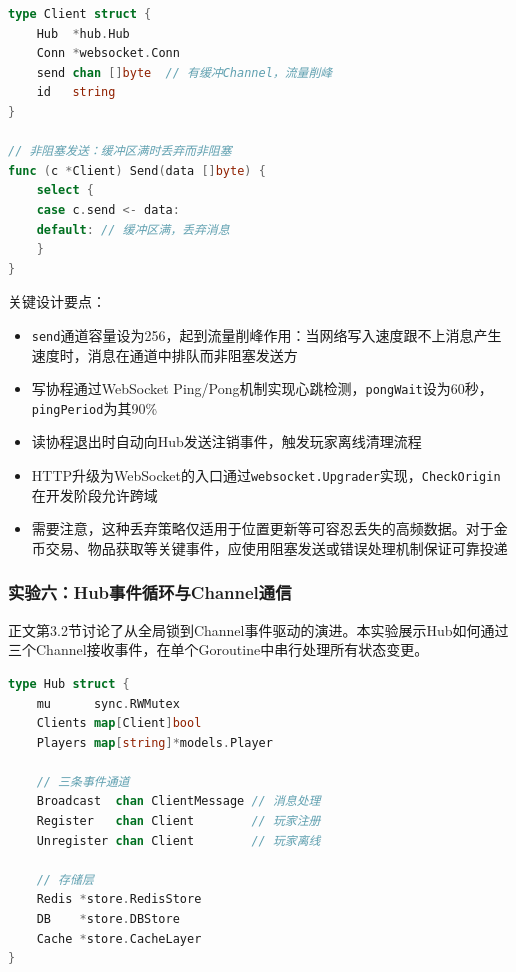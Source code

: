 \begin{tcolorbox}[title=WebSocket客户端核心结构]
\begin{lstlisting}[style=codeblock, language=go]
type Client struct {
    Hub  *hub.Hub
    Conn *websocket.Conn
    send chan []byte  // 有缓冲Channel，流量削峰
    id   string
}

// 非阻塞发送：缓冲区满时丢弃而非阻塞
func (c *Client) Send(data []byte) {
    select {
    case c.send <- data:
    default: // 缓冲区满，丢弃消息
    }
}
\end{lstlisting}
\end{tcolorbox}

关键设计要点：
\begin{itemize}
\item \texttt{send}通道容量设为256，起到流量削峰作用：当网络写入速度跟不上消息产生速度时，消息在通道中排队而非阻塞发送方
\item 写协程通过WebSocket Ping/Pong机制实现心跳检测，\texttt{pongWait}设为60秒，\texttt{pingPeriod}为其90\%
\item 读协程退出时自动向Hub发送注销事件，触发玩家离线清理流程
\item HTTP升级为WebSocket的入口通过\texttt{websocket.Upgrader}实现，\texttt{CheckOrigin}在开发阶段允许跨域
\item 需要注意，这种丢弃策略仅适用于位置更新等可容忍丢失的高频数据。对于金币交易、物品获取等关键事件，应使用阻塞发送或错误处理机制保证可靠投递
\end{itemize}

\subsubsection{实验六：Hub事件循环与Channel通信}

正文第3.2节讨论了从全局锁到Channel事件驱动的演进。本实验展示Hub如何通过三个Channel接收事件，在单个Goroutine中串行处理所有状态变更。

\begin{tcolorbox}[title=Hub事件循环核心结构]
\begin{lstlisting}[style=codeblock, language=go]
type Hub struct {
    mu      sync.RWMutex
    Clients map[Client]bool
    Players map[string]*models.Player

    // 三条事件通道
    Broadcast  chan ClientMessage // 消息处理
    Register   chan Client        // 玩家注册
    Unregister chan Client        // 玩家离线

    // 存储层
    Redis *store.RedisStore
    DB    *store.DBStore
    Cache *store.CacheLayer
}
\end{lstlisting}
\end{tcolorbox}

